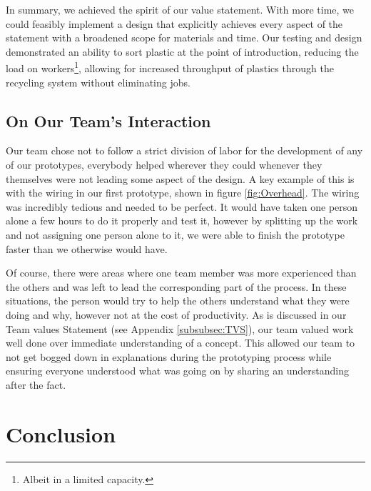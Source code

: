 \documentclass[12pt]{article}
\begin{document}
\begin{multicols*}{2}
            In summary, we achieved the spirit of our value statement. With more time, we could feasibly implement a design that explicitly achieves every aspect of the statement with a broadened scope for materials and time. Our testing and design demonstrated an ability to sort plastic at the point of introduction, reducing the load on workers\footnote{Albeit in a limited capacity.}, allowing for increased throughput of plastics through the recycling system without eliminating jobs.  


        \subsection{On Our Team's Interaction}
            Our team chose not to follow a strict division of labor for the development of any of our prototypes, everybody helped wherever they could whenever they themselves were not leading some aspect of the design. A key example of this is with the wiring in our first prototype, shown in figure \ref{fig:Overhead}. The wiring was incredibly tedious and needed to be perfect. It would have taken one person alone a few hours to do it properly and test it, however by splitting up the work and not assigning one person alone to it, we were able to finish the prototype faster than we otherwise would have. 

            Of course, there were areas where one team member was more experienced than the others and was left to lead the corresponding part of the process. In these situations, the person would try to help the others understand what they were doing and why, however not at the cost of productivity. As is discussed in our Team values Statement (see Appendix \ref{subsubsec:TVS}), our team valued work well done over immediate understanding of a concept. This allowed our team to not get bogged down in explanations during the prototyping process while ensuring everyone understood what was going on by sharing an understanding after the fact.
    \section{Conclusion}

\end{multicols*}
\end{document}

